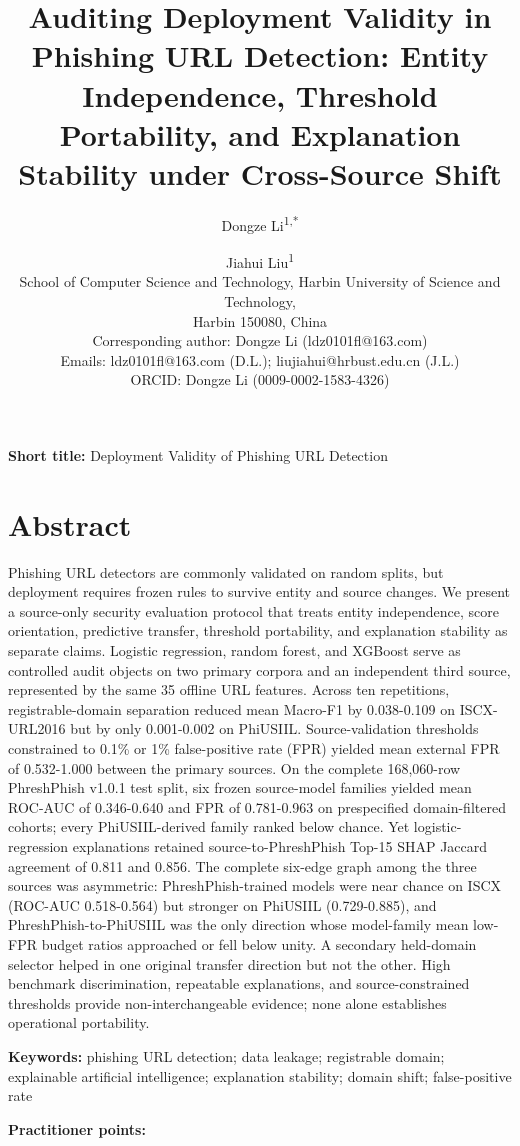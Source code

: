 \documentclass[
  10pt,
]{article}
\title{Auditing Deployment Validity in Phishing URL Detection: Entity
Independence, Threshold Portability, and Explanation Stability under
Cross-Source Shift}
\author{Dongze Li\textsuperscript{1,*} \and Jiahui Liu\textsuperscript{1}\\\small School of Computer Science and Technology, Harbin University of Science and Technology,\\\small Harbin 150080, China\\\small Corresponding author: Dongze Li (ldz0101fl@163.com)\\\small Emails: ldz0101fl@163.com (D.L.); liujiahui@hrbust.edu.cn (J.L.)\\\small ORCID: Dongze Li (0009-0002-1583-4326)}
\date{}
\begin{document}
\maketitle

\textbf{Short title:} Deployment Validity of Phishing URL Detection

\section{Abstract}\label{abstract}

Phishing URL detectors are commonly validated on random splits, but
deployment requires frozen rules to survive entity and source changes.
We present a source-only security evaluation protocol that treats entity
independence, score orientation, predictive transfer, threshold
portability, and explanation stability as separate claims. Logistic
regression, random forest, and XGBoost serve as controlled audit objects
on two primary corpora and an independent third source, represented by
the same 35 offline URL features. Across ten repetitions,
registrable-domain separation reduced mean Macro-F1 by 0.038-0.109 on
ISCX-URL2016 but by only 0.001-0.002 on PhiUSIIL. Source-validation
thresholds constrained to 0.1\% or 1\% false-positive rate (FPR) yielded
mean external FPR of 0.532-1.000 between the primary sources. On the
complete 168,060-row PhreshPhish v1.0.1 test split, six frozen
source-model families yielded mean ROC-AUC of 0.346-0.640 and FPR of
0.781-0.963 on prespecified domain-filtered cohorts; every
PhiUSIIL-derived family ranked below chance. Yet logistic-regression
explanations retained source-to-PhreshPhish Top-15 SHAP Jaccard
agreement of 0.811 and 0.856. The complete six-edge graph among the
three sources was asymmetric: PhreshPhish-trained models were near
chance on ISCX (ROC-AUC 0.518-0.564) but stronger on PhiUSIIL
(0.729-0.885), and PhreshPhish-to-PhiUSIIL was the only direction whose
model-family mean low-FPR budget ratios approached or fell below unity.
A secondary held-domain selector helped in one original transfer
direction but not the other. High benchmark discrimination, repeatable
explanations, and source-constrained thresholds provide
non-interchangeable evidence; none alone establishes operational
portability.

\textbf{Keywords:} phishing URL detection; data leakage; registrable
domain; explainable artificial intelligence; explanation stability;
domain shift; false-positive rate

\textbf{Practitioner points:}
\end{document}
